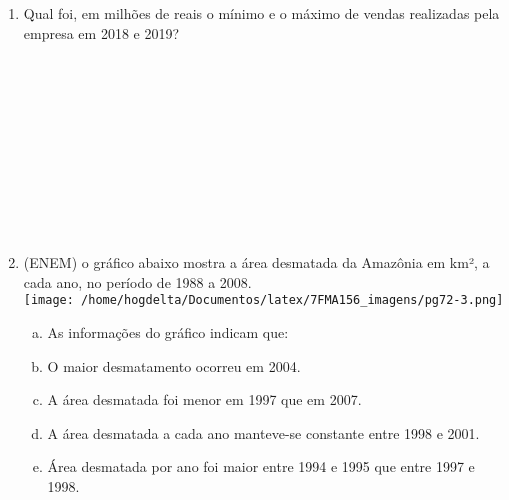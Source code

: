 \documentclass[a4paper,14pt]{article}
\begin{document}
\begin{multicols}{2}
\begin{enumerate}
			\item Qual foi, em milhões de reais o mínimo e o máximo de vendas realizadas pela empresa em 2018 e 2019?
			\\\\\\\\\\\\\\\\\\\\\\
			\item (ENEM) o gráfico abaixo mostra a área desmatada da Amazônia em km², a cada ano, no período de 1988 a 2008. \\
			\texttt{[image: /home/hogdelta/Documentos/latex/7FMA156\_imagens/pg72-3.png]}
		    \\
		    \begin{enumerate}[a)]
		    	\item As informações do gráfico indicam que:
		    	
		    	\item O maior desmatamento ocorreu em 2004.
		    	
		    	\item A área desmatada foi menor em 1997 que em 2007.
		    	
		    	\item A área desmatada a cada ano manteve-se constante entre 1998 e 2001.
		    	
		    	\item Área desmatada por ano foi maior entre 1994 e 1995 que entre 1997 e 1998.
		    	

\end{enumerate}
\end{enumerate}
\end{multicols}
\end{document}
